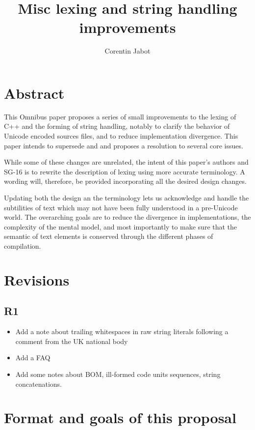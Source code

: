 \documentclass{wg21}
\title{Misc lexing and string handling improvements}
\author{Corentin Jabot}{corentin.jabot@gmail.com}
\begin{document}
\maketitle

\paperquote{}

\section{Abstract}

This Omnibus paper proposes a series of small improvements to the lexing of C++ and the forming of string handling,
notably to clarify the behavior of Unicode encoded sources files, and to reduce implementation divergence.
This paper intends to supersede  and  and proposes a resolution to several core issues.

While some of these changes are unrelated, the intent of this paper's authors and SG-16 is to rewrite the description of lexing
using more accurate terminology. A wording will, therefore, be provided incorporating all the desired design changes.

Updating both the design an the terminology lets us acknowledge and handle the subtilities of text which may not have been fully understood
in a pre-Unicode world.
The overarching goals are to reduce the divergence in implementations, the complexity of the mental model, and most importantly to make sure that
the semantic of text elements is conserved through the different phases of compilation.

\section{Revisions}

\subsection{R1}
\begin{itemize}
\item Add a note about trailing whitespaces in raw string literals following a comment from the UK national body
\item Add a FAQ
\item Add some notes about BOM, ill-formed code units sequences, string concatenations.
\end{itemize}


\section{Format and goals of this proposal}
\end{document}
